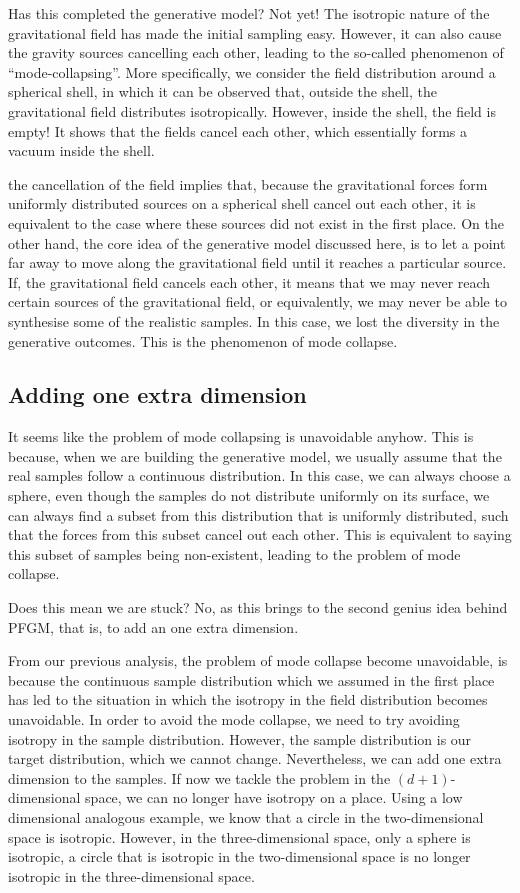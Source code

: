 Has this completed the generative model? Not yet! The isotropic nature of the gravitational field has made the initial sampling easy. However, it can also cause the gravity sources cancelling each other, leading to the so-called phenomenon of ``mode-collapsing''. More specifically, we consider the field distribution around a spherical shell, in which it can be observed that, outside the shell, the gravitational field distributes isotropically. However, inside the shell, the field is empty! It shows that the fields cancel each other, which essentially forms a vacuum inside the shell.

the cancellation of the field implies that, because the gravitational forces form uniformly distributed sources on a spherical shell cancel out each other, it is equivalent to the case where these sources did not exist in the first place. On the other hand, the core idea of the generative model discussed here, is to let a point far away to move along the gravitational field until it reaches a particular source. If, the gravitational field cancels each other, it means that we may never reach certain sources of the gravitational field, or equivalently, we may never be able to synthesise some of the realistic samples. In this case, we lost the diversity in the generative outcomes. This is the phenomenon of mode collapse.

\subsection{Adding one extra dimension}

It seems like the problem of mode collapsing is unavoidable anyhow. This is because, when we are building the generative model, we usually assume that the real samples follow a continuous distribution. In this case, we can always choose a sphere, even though the samples do not distribute uniformly on its surface, we can always find a subset from this distribution that is uniformly distributed, such that the forces from this subset cancel out each other. This is equivalent to saying this subset of samples being non-existent, leading to the problem of mode collapse. 

Does this mean we are stuck? No, as this brings to the second genius idea behind PFGM, that is, to add an one extra dimension.

From our previous analysis, the problem of mode collapse become unavoidable, is because the continuous sample distribution which we assumed in the first place has led to the situation in which the isotropy in the field distribution becomes unavoidable. In order to avoid the mode collapse, we need to try avoiding isotropy in the sample distribution. However, the sample distribution is our target distribution, which we cannot change. Nevertheless, we can add one extra dimension to the samples. If now we tackle the problem in the $(d+1)$-dimensional space, we can no longer have isotropy on a place. Using a low dimensional analogous example, we know that a circle in the two-dimensional space is isotropic. However, in the three-dimensional space, only a sphere is isotropic, a circle that is isotropic in the two-dimensional space is no longer isotropic in the three-dimensional space.

